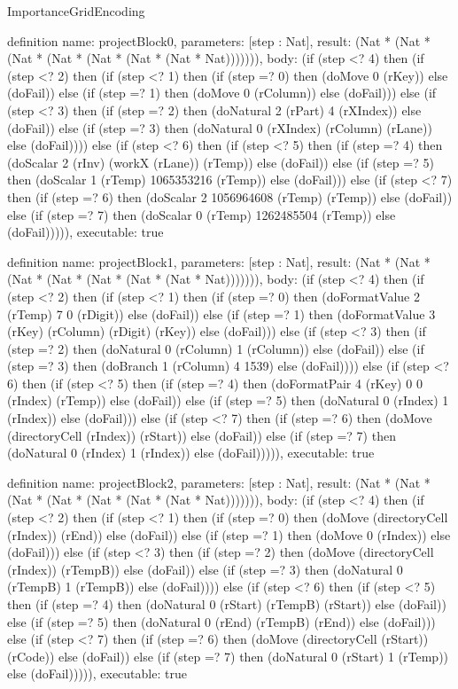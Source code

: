 \begin{lexlean}{ImportanceGridEncoding}
\begin{semanticmodule}
definition{
  name: projectBlock0,
  parameters: [step : Nat],
  result: (Nat * (Nat * (Nat * (Nat * (Nat * (Nat * (Nat * Nat))))))),
  body: (if (step <? 4) then
      (if (step <? 2) then
      (if (step <? 1) then
      (if (step =? 0) then (doMove 0 (rKey)) else (doFail)) else
      (if (step =? 1) then (doMove 0 (rColumn)) else (doFail))) else
      (if (step <? 3) then
      (if (step =? 2) then (doNatural 2 (rPart) 4 (rXIndex)) else (doFail)) else
      (if (step =? 3) then (doNatural 0 (rXIndex) (rColumn) (rLane)) else (doFail)))) else
      (if (step <? 6) then
      (if (step <? 5) then
      (if (step =? 4) then (doScalar 2 (rInv) (workX (rLane)) (rTemp)) else (doFail)) else
      (if (step =? 5) then (doScalar 1 (rTemp) 1065353216 (rTemp)) else (doFail))) else
      (if (step <? 7) then
      (if (step =? 6) then (doScalar 2 1056964608 (rTemp) (rTemp)) else (doFail)) else
      (if (step =? 7) then (doScalar 0 (rTemp) 1262485504 (rTemp)) else (doFail))))),
  executable: true
}

definition{
  name: projectBlock1,
  parameters: [step : Nat],
  result: (Nat * (Nat * (Nat * (Nat * (Nat * (Nat * (Nat * Nat))))))),
  body: (if (step <? 4) then
      (if (step <? 2) then
      (if (step <? 1) then
      (if (step =? 0) then (doFormatValue 2 (rTemp) 7 0 (rDigit)) else (doFail)) else
      (if (step =? 1) then (doFormatValue 3 (rKey) (rColumn) (rDigit) (rKey)) else (doFail))) else
      (if (step <? 3) then
      (if (step =? 2) then (doNatural 0 (rColumn) 1 (rColumn)) else (doFail)) else
      (if (step =? 3) then (doBranch 1 (rColumn) 4 1539) else (doFail)))) else
      (if (step <? 6) then
      (if (step <? 5) then
      (if (step =? 4) then (doFormatPair 4 (rKey) 0 0 (rIndex) (rTemp)) else (doFail)) else
      (if (step =? 5) then (doNatural 0 (rIndex) 1 (rIndex)) else (doFail))) else
      (if (step <? 7) then
      (if (step =? 6) then (doMove (directoryCell (rIndex)) (rStart)) else (doFail)) else
      (if (step =? 7) then (doNatural 0 (rIndex) 1 (rIndex)) else (doFail))))),
  executable: true
}

definition{
  name: projectBlock2,
  parameters: [step : Nat],
  result: (Nat * (Nat * (Nat * (Nat * (Nat * (Nat * (Nat * Nat))))))),
  body: (if (step <? 4) then
      (if (step <? 2) then
      (if (step <? 1) then
      (if (step =? 0) then (doMove (directoryCell (rIndex)) (rEnd)) else (doFail)) else
      (if (step =? 1) then (doMove 0 (rIndex)) else (doFail))) else
      (if (step <? 3) then
      (if (step =? 2) then (doMove (directoryCell (rIndex)) (rTempB)) else (doFail)) else
      (if (step =? 3) then (doNatural 0 (rTempB) 1 (rTempB)) else (doFail)))) else
      (if (step <? 6) then
      (if (step <? 5) then
      (if (step =? 4) then (doNatural 0 (rStart) (rTempB) (rStart)) else (doFail)) else
      (if (step =? 5) then (doNatural 0 (rEnd) (rTempB) (rEnd)) else (doFail))) else
      (if (step <? 7) then
      (if (step =? 6) then (doMove (directoryCell (rStart)) (rCode)) else (doFail)) else
      (if (step =? 7) then (doNatural 0 (rStart) 1 (rTemp)) else (doFail))))),
  executable: true
}


\end{semanticmodule}
\end{lexlean}
